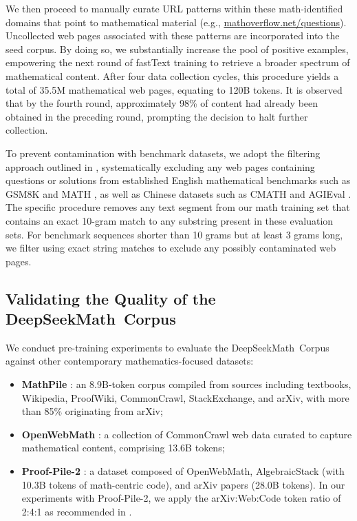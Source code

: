 We then proceed to manually curate URL patterns within these math-identified domains that point to mathematical material (e.g., \url{mathoverflow.net/questions}). Uncollected web pages associated with these patterns are incorporated into the seed corpus. By doing so, we substantially increase the pool of positive examples, empowering the next round of fastText training to retrieve a broader spectrum of mathematical content. After four data collection cycles, this procedure yields a total of 35.5M mathematical web pages, equating to 120B tokens. It is observed that by the fourth round, approximately 98\% of content had already been obtained in the preceding round, prompting the decision to halt further collection.

To prevent contamination with benchmark datasets, we adopt the filtering approach outlined in \cite{deepseek-coder}, systematically excluding any web pages containing questions or solutions from established English mathematical benchmarks such as GSM8K \citep{gsm8k} and MATH \citep{MATH}, as well as Chinese datasets such as CMATH \citep{wei2023cmath} and AGIEval \citep{agieval}. The specific procedure removes any text segment from our math training set that contains an exact 10-gram match to any substring present in these evaluation sets. For benchmark sequences shorter than 10 grams but at least 3 grams long, we filter using exact string matches to exclude any possibly contaminated web pages.

\subsection{Validating the Quality of the DeepSeekMath~Corpus}

We conduct pre-training experiments to evaluate the DeepSeekMath~Corpus against other contemporary mathematics-focused datasets:

\begin{itemize}[topsep=0pt]
    \item \textbf{MathPile} \citep{mathpile}: an 8.9B-token corpus compiled from sources including textbooks, Wikipedia, ProofWiki, CommonCrawl, StackExchange, and arXiv, with more than 85\% originating from arXiv;
    \item \textbf{OpenWebMath} \citep{openwebmath}: a collection of CommonCrawl web data curated to capture mathematical content, comprising 13.6B tokens;
    \item \textbf{Proof-Pile-2} \citep{llemma}: a dataset composed of OpenWebMath, AlgebraicStack (with 10.3B tokens of math-centric code), and arXiv papers (28.0B tokens). In our experiments with Proof-Pile-2, we apply the arXiv:Web:Code token ratio of 2:4:1 as recommended in \cite{llemma}.
\end{itemize}

